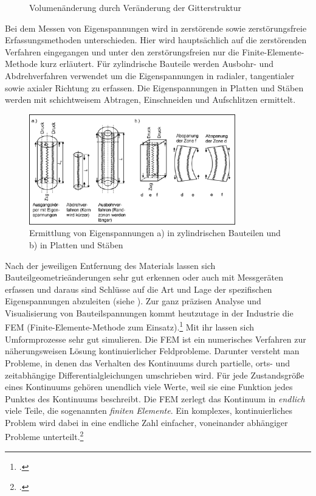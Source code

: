 \documentclass[12pt,a4paper,parskip]{scrartcl}
\begin{document}
{\begin{itemize*}
\begin{figure}
  \caption[Volumenänderung durch Veränderung der Gitterstruktur]{Volumenänderung durch Veränderung der Gitterstruktur\protect\footnotemark}
  \label{fig:eigenspanmol}
  \end{figure}
\end{itemize*}

Bei dem Messen von Eigenspannungen wird in zerstörende sowie zerstörungsfreie Erfassungsmethoden unterschieden. Hier wird hauptsächlich auf die zerstörenden Verfahren eingegangen und unter den zerstörungsfreien nur die Finite-Elemente-Methode kurz erläutert. Für zylindrische Bauteile werden Ausbohr- und Abdrehverfahren verwendet um die Eigenspannungen in radialer, tangentialer sowie axialer Richtung zu erfassen. Die Eigenspannungen in Platten und Stäben werden mit schichtweisem Abtragen, Einschneiden und Aufschlitzen ermittelt.\begin{figure}
  \centering
  \includegraphics[width=0.8\textwidth]{eigenspanschnitt}
  \caption[Ermittlung von Eigenspannungen]{Ermittlung von Eigenspannungen a) in zylindrischen Bauteilen und b) in Platten und Stäben\protect\footnotemark}
  \label{fig:eigenspanschnitt}
  \end{figure}
  Nach der jeweiligen Entfernung des Materials lassen sich Bauteilgeometrieänderungen sehr gut erkennen oder auch mit Messgeräten erfassen und daraus  sind Schlüsse auf die Art und Lage der spezifischen Eigenspannungen abzuleiten (siehe ). Zur ganz präzisen Analyse  und Visualisierung von Bauteilspannungen kommt heutzutage in der Industrie  die FEM (Finite-Elemente-Methode zum Einsatz).\footcite[Vgl.][32-37]{hu} Mit ihr lassen sich Umformprozesse sehr gut simulieren. Die FEM ist ein numerisches Verfahren zur näherungsweisen Lösung kontinuierlicher Feldprobleme. Darunter versteht man Probleme, in denen das Verhalten des Kontinuums durch partielle, orts- und zeitabhängige Differentialgleichungen umschrieben wird. Für jede Zustandsgröße eines Kontinuums gehören unendlich viele Werte, weil sie eine Funktion jedes Punktes des Kontinuums beschreibt. Die FEM zerlegt das Kontinuum in \emph{endlich} viele Teile, die sogenannten \emph{finiten Elemente}. Ein komplexes, kontinuierliches Problem wird dabei in eine endliche Zahl einfacher, voneinander abhängiger Probleme unterteilt.\footcite[Vgl.][48]{fu}
}
\end{document}
